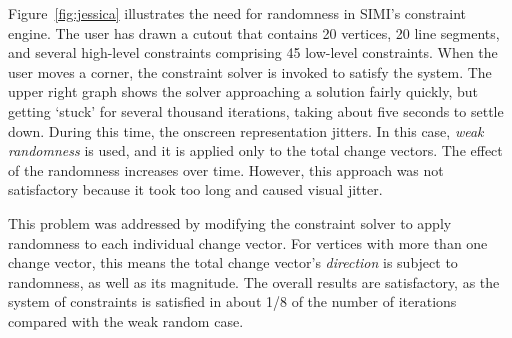 

Figure~\ref{fig:jessica} illustrates the need for randomness in SIMI's
constraint engine. The user has drawn a cutout that contains 20
vertices, 20 line segments, and several high-level constraints
comprising 45 low-level constraints. When the user moves a corner, the
constraint solver is invoked to satisfy the system. The upper right
graph shows the solver approaching a solution fairly quickly, but
getting `stuck' for several thousand iterations, taking about five
seconds to settle down. During this time, the onscreen representation
jitters. In this case, \textit{weak randomness} is used, and it is
applied only to the total change vectors. The effect of the randomness
increases over time. However, this approach was not satisfactory
because it took too long and caused visual jitter.

This problem was addressed by modifying the constraint solver to apply
randomness to each individual change vector. For vertices with more
than one change vector, this means the total change vector's
\textit{direction} is subject to randomness, as well as its
magnitude. The overall results are satisfactory, as the system of
constraints is satisfied in about 1/8 of the number of iterations
compared with the weak random case.

